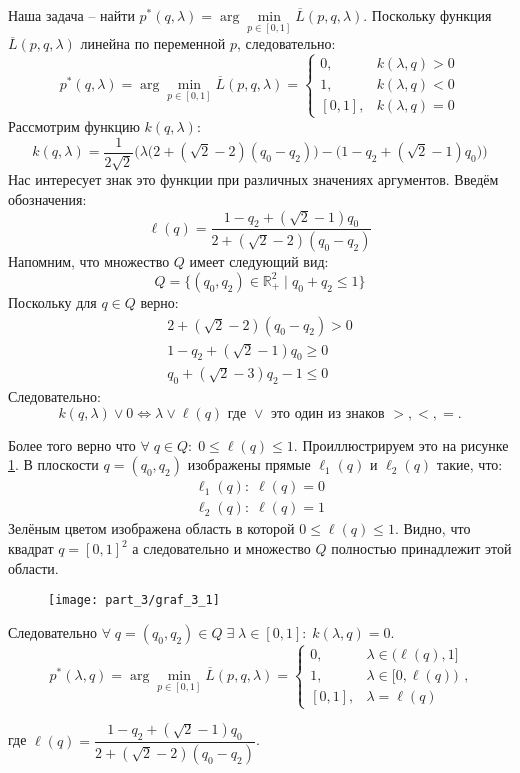 Наша задача -- найти 
$p^*(q, \lambda)=\arg \min \limits_{p \in [0, 1]} \overline{L}(p,q,\lambda)$.
Поскольку функция $\overline{L}(p,q,\lambda)$ линейна по переменной 
$p$, следовательно:
$$
	p^*(q, \lambda) =
	\arg \min \limits_{p \in [0, 1]} \overline{L}(p,q,\lambda) =
	\begin{cases}
		0, & k(\lambda,q)>0 \\
		1, & k(\lambda,q)<0 \\
		[0,1], & k(\lambda,q)=0
	\end{cases}	
$$
Рассмотрим функцию $k(q, \lambda)$:
$$
	k(q, \lambda)=\frac{1}{2\sqrt{2}}
	\Big(
		\lambda \big (2+(\sqrt{2}-2)(q_0-q_2) \big) -
		\big (1 - q_2 + (\sqrt{2} - 1)q_0 \big)
	\Big)
$$
Нас интересует знак это функции при различных значениях аргументов.
Введём обозначения:
$$
	\ell(q) = \frac{1 - q_2 + (\sqrt{2} - 1)q_0}{2+(\sqrt{2}-2)(q_0-q_2)}
$$
Напомним, что множество $Q$ имеет следующий вид:
$$
	Q = \{
		(q_0,q_2) \in \mathbb{R}^2_{+} \; | \;
		q_0 + q_2 \leqslant 1
	\}	
$$	
Поскольку для $q \in Q$ верно: 
\begin{gather*}
	2+(\sqrt{2}-2)(q_0-q_2) > 0 
	\\
	1 - q_2 + (\sqrt{2} - 1)q_0 \geqslant 0 
	\\
	q_0 + (\sqrt{2} - 3) q_2 - 1 \leqslant 0
\end{gather*}
Следовательно:
$$
	k(q, \lambda) \vee 0 \Leftrightarrow 
	\lambda \vee \ell(q) \textrm{ где } \vee 
	\textrm{ это один из знаков } >,<,=.
$$
	
Более того верно что 
$\forall \; q \in Q: \; 0 \leqslant \ell(q) \leqslant 1$. 
Проиллюстрируем это на рисунке \ref{fig:l}. 
В плоскости $q=(q_0,q_2)$ изображены 
прямые $\ell_1(q)$ и $\ell_2(q)$ такие, что:
\begin{gather*}
	\ell_1(q): \; \ell(q)=0 
	\\
	\ell_2(q): \; \ell(q)=1
\end{gather*}
Зелёным цветом изображена область в которой
$0 \leqslant \ell(q) \leqslant 1$.
Видно, что квадрат $q = [0,1]^2$ а следовательно и
множество $Q$ полностью принадлежит этой области.
\begin{figure}[H]
	\centering
  	\texttt{[image: part\_3/graf\_3\_1]}
  	\caption{}
  	\label{fig:l}
\end{figure}

Следовательно $\forall \; q=(q_0, q_2) \in Q \;
\exists \; \lambda \in [0,1]: \; k(\lambda,q)=0$.
\begin{equation}
	\label{eq:p*}
	p^*(\lambda,q)=
	\arg \min \limits_{p \in [0, 1]} \overline{L}(p,q,\lambda)=
	\begin{cases}
		0, & \lambda \in \big(\ell (q), 1\big] \\
		1, & \lambda \in \big[0, \ell(q) \big) \\
		[0,1], & \lambda=\ell(q)
	\end{cases},
\end{equation}

где $\ell(q)=\dfrac{1 - q_2 + (\sqrt{2} - 1)q_0}{2+(\sqrt{2}-2)(q_0-q_2)}$.